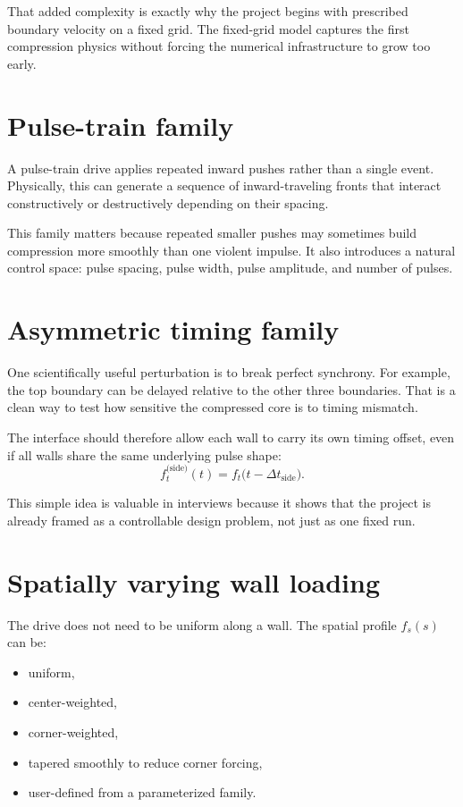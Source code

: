 \documentclass[11pt]{article}
\begin{document}
That added complexity is exactly why the project begins with prescribed boundary velocity on a fixed grid. The fixed-grid model captures the first compression physics without forcing the numerical infrastructure to grow too early.

\section{Pulse-train family}
A pulse-train drive applies repeated inward pushes rather than a single event. Physically, this can generate a sequence of inward-traveling fronts that interact constructively or destructively depending on their spacing.

This family matters because repeated smaller pushes may sometimes build compression more smoothly than one violent impulse. It also introduces a natural control space: pulse spacing, pulse width, pulse amplitude, and number of pulses.

\section{Asymmetric timing family}
One scientifically useful perturbation is to break perfect synchrony. For example, the top boundary can be delayed relative to the other three boundaries. That is a clean way to test how sensitive the compressed core is to timing mismatch.

The interface should therefore allow each wall to carry its own timing offset, even if all walls share the same underlying pulse shape:
\[
 f_t^{\text{(side)}}(t) = f_t\bigl(t-\Delta t_{\text{side}}\bigr).
\]

This simple idea is valuable in interviews because it shows that the project is already framed as a controllable design problem, not just as one fixed run.

\section{Spatially varying wall loading}
The drive does not need to be uniform along a wall. The spatial profile $f_s(s)$ can be:
\begin{itemize}
    \item uniform,
    \item center-weighted,
    \item corner-weighted,
    \item tapered smoothly to reduce corner forcing,
    \item user-defined from a parameterized family.
\end{itemize}
\end{document}
